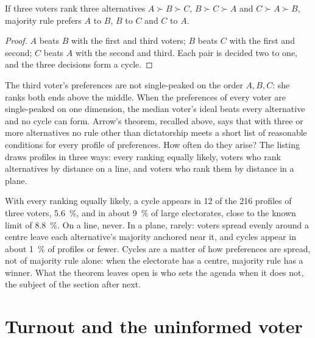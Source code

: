 \begin{proposition}\label{prop:b3:public-choice-voting:cycle}
If three voters rank three alternatives $A \succ B \succ C$, $B \succ C \succ A$ and
$C \succ A \succ B$, majority rule prefers $A$ to $B$, $B$ to $C$ and $C$ to $A$.
\end{proposition}

\begin{proof}
$A$ beats $B$ with the first and third voters; $B$ beats $C$ with the first and
second; $C$ beats $A$ with the second and third. Each pair is decided two to one,
and the three decisions form a cycle.
\end{proof}

The third voter's preferences are not single-peaked on the order $A, B, C$: she
ranks both ends above the middle. When the preferences of every voter are
single-peaked on one dimension, the median voter's ideal beats every alternative and
no cycle can form. Arrow's theorem, recalled above, says that with three or more
alternatives no rule other than dictatorship meets a short list of reasonable
conditions for every profile of preferences. How often do they arise? The listing
draws profiles in three ways: every ranking equally likely, voters who rank
alternatives by distance on a line, and voters who rank them by distance in a plane.

\label{lst:b3:public-choice-voting:condorcet}

\label{out:b3:public-choice-voting:condorcet}

With every ranking equally likely, a cycle appears in 12 of the 216 profiles of
three voters, 5.6~\%, and in about 9~\% of large electorates, close to the known limit
of 8.8~\%. On a line, never. In a plane, rarely: voters spread evenly around a centre
leave each alternative's majority anchored near it, and cycles appear in about 1~\%
of profiles or fewer. %
Cycles are a matter of how preferences are spread, not of majority rule alone:
when the electorate has a centre, majority rule has a winner. What the theorem
leaves open is who sets the agenda when it does not, the subject of the section
after next.

\section{Turnout and the uninformed voter}\label{sec:b3:public-choice-voting:turnout}

